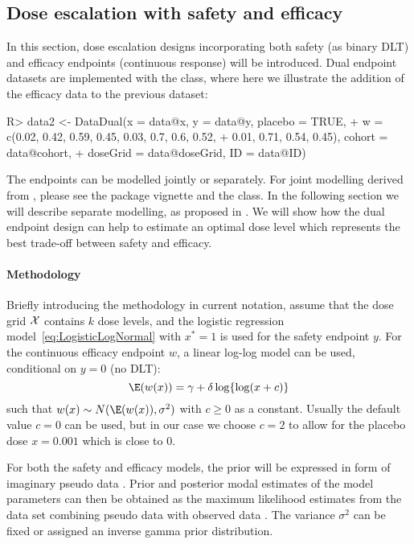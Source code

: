 \documentclass[article]{jss}\usepackage[]{graphicx}\usepackage[]{color}
\begin{document}
\subsection{Dose escalation with safety and efficacy}
\label{subsec:dualendpoint}

In this section, dose escalation designs incorporating both safety (as binary DLT) and efficacy endpoints (continuous response) will be introduced. Dual endpoint datasets are implemented with the  class, where here we illustrate
the addition of the efficacy data  to the previous dataset:
\begin{Schunk}
\begin{Sinput}
R> data2 <- DataDual(x = data@x, y = data@y, placebo = TRUE,
+                    w = c(0.02, 0.42, 0.59, 0.45, 0.03, 0.7, 0.6, 0.52, 
+                          0.01, 0.71, 0.54, 0.45), cohort = data@cohort, 
+                    doseGrid = data@doseGrid, ID = data@ID)
\end{Sinput}
\end{Schunk}
The endpoints can be modelled jointly or separately. For joint modelling derived from \cite{bekele2005}, please see the package vignette and the  class. In the following section we will describe separate modelling, as proposed in \cite{yeung2015}. We will show how the dual endpoint design can help to estimate an optimal dose level which represents the best trade-off between safety and efficacy. 

\paragraph{Methodology} Briefly introducing the methodology in current notation, assume that the dose grid $\cal{X}$ contains $k$ dose levels, and the logistic regression model~\eqref{eq:LogisticLogNormal} with $x^{*}=1$ is used for the safety endpoint $y$. For the continuous efficacy endpoint $w$, a linear log-log model can be used, conditional on $y=0$ (no DLT):
\begin{equation}\label{eq:loglog}
\E(w(x)) = \gamma + \delta \log\{\log(x + c)\} 
\end{equation}
such that $w(x) \sim N(\E(w(x)), \sigma^2)$ with $c \geq 0$ as a constant. Usually the default value $c=0$ can be used, but in our case we choose $c=2$ to allow for the placebo dose $x=0.001$ which is close to 0. 

For both the safety and efficacy models, the prior will be expressed in form of imaginary pseudo data \citep[see][for details]{yeung2015}. Prior and posterior modal estimates of the model parameters can then be obtained as the maximum likelihood estimates from the data set combining pseudo data with observed data \citep{w06}. The variance $\sigma^{2}$ can be fixed or assigned an inverse gamma prior distribution.
\end{document}
